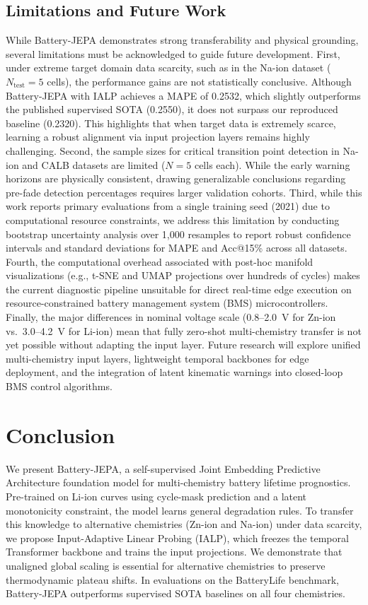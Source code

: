 \documentclass[a4paper,fleqn]{cas-dc}
\begin{document}
\subsection{Limitations and Future Work}
\label{sec:limitations}
While Battery-JEPA demonstrates strong transferability and physical grounding, several limitations must be acknowledged to guide future development. 
First, under extreme target domain data scarcity, such as in the Na-ion dataset ($N_{\text{test}} = 5$ cells), the performance gains are not statistically conclusive. Although Battery-JEPA with IALP achieves a MAPE of 0.2532, which slightly outperforms the published supervised SOTA (0.2550), it does not surpass our reproduced baseline (0.2320). This highlights that when target data is extremely scarce, learning a robust alignment via input projection layers remains highly challenging.
Second, the sample sizes for critical transition point detection in Na-ion and CALB datasets are limited ($N = 5$ cells each). While the early warning horizons are physically consistent, drawing generalizable conclusions regarding pre-fade detection percentages requires larger validation cohorts.
Third, while this work reports primary evaluations from a single training seed (2021) due to computational resource constraints, we address this limitation by conducting bootstrap uncertainty analysis over 1,000 resamples to report robust confidence intervals and standard deviations for MAPE and Acc@15\% across all datasets.
Fourth, the computational overhead associated with post-hoc manifold visualizations (e.g., t-SNE and UMAP projections over hundreds of cycles) makes the current diagnostic pipeline unsuitable for direct real-time edge execution on resource-constrained battery management system (BMS) microcontrollers.
Finally, the major differences in nominal voltage scale (0.8--2.0~V for Zn-ion vs.\ 3.0--4.2~V for Li-ion) mean that fully zero-shot multi-chemistry transfer is not yet possible without adapting the input layer. Future research will explore unified multi-chemistry input layers, lightweight temporal backbones for edge deployment, and the integration of latent kinematic warnings into closed-loop BMS control algorithms.

\section{Conclusion}
\label{sec:conclusion}
We present Battery-JEPA, a self-supervised Joint Embedding Predictive Architecture foundation model for multi-chemistry battery lifetime prognostics. Pre-trained on Li-ion curves using cycle-mask prediction and a latent monotonicity constraint, the model learns general degradation rules. To transfer this knowledge to alternative chemistries (Zn-ion and Na-ion) under data scarcity, we propose Input-Adaptive Linear Probing (IALP), which freezes the temporal Transformer backbone and trains the input projections. We demonstrate that unaligned global scaling is essential for alternative chemistries to preserve thermodynamic plateau shifts. In evaluations on the BatteryLife benchmark, Battery-JEPA outperforms supervised SOTA baselines on all four chemistries.
\end{document}
